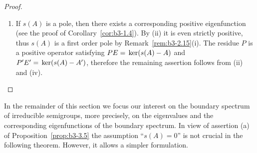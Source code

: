 \begin{proof}
\begin{enumerate}[\upshape (i), wide, labelindent=.5em]
	\item 
	If $s(A)$ is a pole, then there exists a corresponding positive eigenfunction (see the proof of Corollary~\ref{cor:b3-1.4}).
	By (ii) it is even strictly positive, thus $s(A)$ is a first order pole by Remark~\ref{rem:b3-2.15}(i).
	The residue $P$ is a positive operator satisfying $PE = \mathop{}\mathrm{ker}(s(A) - A)$ and $P'E' = \mathop{}\mathrm{ker}(s(A) - A')$, therefore the remaining assertion follows from (ii) and (iv).
	\end{enumerate}
	\end{proof}
In the remainder of this section we focus our interest on the boundary spectrum of irreducible semigroups, more precisely, on the eigenvalues and the corresponding eigenfunctions of the boundary spectrum. 
In view of assertion (a) of Proposition~\ref{prop:b3-3.5} the assumption \enquote{$s(A) = 0$} is not crucial in the following theorem. 
However, it allows a simpler formulation. 

